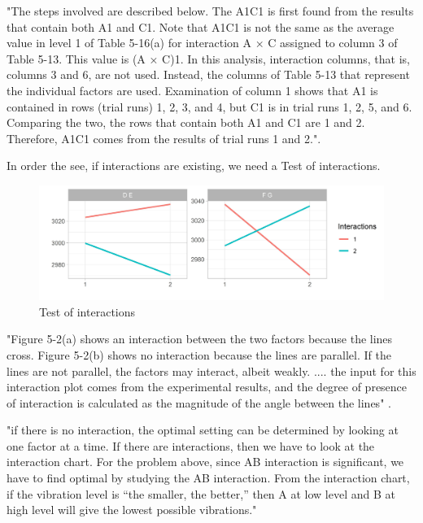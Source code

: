"The steps involved are described below. The A1C1 is first found from the results that contain both A1 and C1. Note that A1C1 is not the same as the average value in level 1 of Table 5-16(a) for interaction A × C assigned to column 3 of Table 5-13. This value is (A × C)1. In this analysis, interaction columns, that is, columns 3 and 6, are not used. Instead, the columns of Table 5-13 that represent the individual factors are used. Examination of column 1 shows that A1 is contained in rows (trial runs) 1, 2, 3, and 4, but C1 is in trial runs 1, 2, 5, and 6. Comparing the two, the rows that contain both A1 and C1 are 1 and 2. Therefore, A1C1 comes from the results of trial runs 1 and 2."\cite{roy_primer_1990}.


In order the see, if interactions are existing, we need a Test of interactions.
\begin{figure}[H] 
	\label{figure:taguchi:test_of_interaction}
	\includegraphics[width=1\linewidth]{simulations/taguchi/plots/test_of_interaction}
	\caption{Test of interactions}
\end{figure}

"Figure 5-2(a) shows an interaction between the two factors because the lines cross. Figure 5-2(b) shows no interaction because the lines are parallel. If the lines are not parallel, the factors may interact, albeit weakly. .... the input for this interaction plot comes from the experimental results, and the degree of presence of interaction is calculated as the magnitude of the angle between the lines" \cite{roy_primer_1990}.





"if there is no interaction, the optimal setting can be determined by looking at one factor at a time. If there are interactions, then we have to look at the interaction chart. For the problem above, since AB interaction is significant, we have to find optimal by studying the AB interaction. From the interaction chart, if the vibration level is “the smaller, the better,” then A at low level and B at high level will give the lowest possible vibrations."\cite{yang_design_2009}



